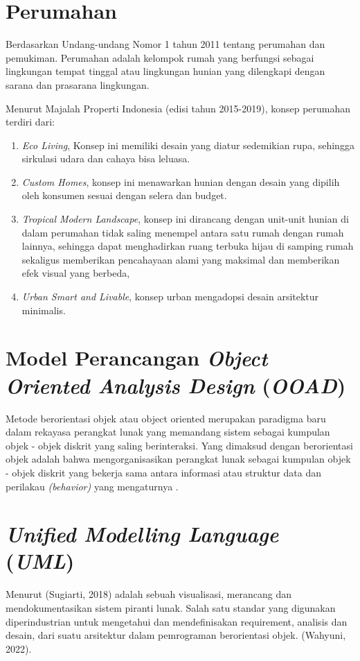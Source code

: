 \section{Perumahan}
Berdasarkan Undang-undang Nomor 1 tahun 2011 tentang perumahan dan pemukiman. Perumahan adalah kelompok rumah yang berfungsi sebagai lingkungan tempat tinggal atau lingkungan hunian yang dilengkapi dengan sarana dan prasarana lingkungan.
\par Menurut Majalah Properti Indonesia (edisi tahun 2015-2019), konsep perumahan terdiri dari: 
\begin{enumerate}
\item \textit{Eco Living}, Konsep ini memiliki desain yang diatur sedemikian rupa, sehingga sirkulasi udara dan cahaya bisa leluasa.
\item \textit{Custom Homes}, konsep ini menawarkan hunian dengan desain yang dipilih oleh konsumen sesuai dengan selera dan budget.
\item \textit{Tropical Modern Landscape}, konsep ini dirancang dengan unit-unit hunian di dalam perumahan tidak saling menempel antara satu rumah dengan rumah lainnya, sehingga dapat menghadirkan ruang terbuka hijau di samping rumah sekaligus memberikan pencahayaan alami yang maksimal dan memberikan efek visual yang berbeda, 
\item \textit{Urban Smart and Livable}, konsep urban mengadopsi desain arsitektur minimalis.
\end{enumerate}
\section{Model Perancangan \textit{Object Oriented Analysis Design} (\textit{OOAD}) }
Metode berorientasi objek atau object oriented merupakan paradigma baru dalam rekayasa perangkat lunak yang memandang sistem sebagai kumpulan objek - objek diskrit yang saling berinteraksi. Yang dimaksud dengan berorientasi objek adalah bahwa mengorganisasikan perangkat lunak sebagai kumpulan objek - objek diskrit yang bekerja sama antara informasi atau struktur data dan perilakau \textit{(behavior)} yang mengaturnya \citep{ariska2016rancang}.
\section{\textit{Unified Modelling Language} (\textit{UML})}
Menurut (Sugiarti, 2018) adalah sebuah visualisasi, merancang dan mendokumentasikan sistem piranti lunak. Salah satu standar yang digunakan diperindustrian untuk mengetahui dan mendefinisakan requirement, analisis dan desain, dari suatu arsitektur dalam pemrograman berorientasi objek. (Wahyuni, 2022).
